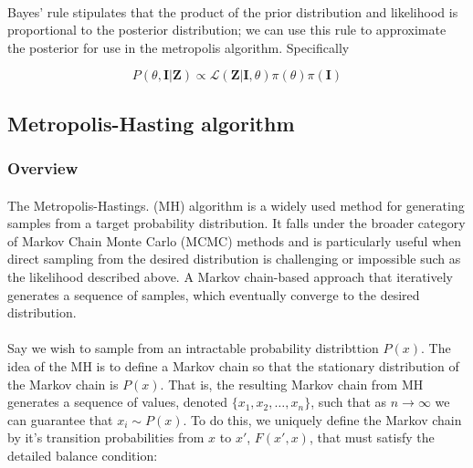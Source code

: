 \paragraph{}Bayes' rule stipulates that the product of the prior distribution and likelihood is proportional to the posterior distribution; we can use this rule to approximate the posterior for use in the metropolis algorithm. Specifically 

\begin{equation}
\label{eq:bayes}
P(\theta, \mathbf{I} | \mathbf{Z}) \propto \mathcal{L}(\mathbf{Z} | \mathbf{I}, \theta)\pi(\theta)\pi(\mathbf{I})
\end{equation}


\subsection{Metropolis-Hasting algorithm}

\subsubsection{Overview}
\paragraph{} The Metropolis-Hastings. (MH) algorithm is a widely used method for generating samples from a target probability distribution. It falls under the broader category of Markov Chain Monte Carlo (MCMC) methods and is particularly useful when direct sampling from the desired distribution is challenging or impossible such as the likelihood described above. A Markov chain-based approach that iteratively generates a sequence of samples, which eventually converge to the desired distribution. 

\paragraph{}Say we wish to sample from an intractable probability distribttion $P(x)$. The idea of the MH is to define a Markov chain so that the stationary distribution of the Markov chain is $P(x)$. That is, the resulting Markov chain from MH generates a sequence of values, denoted $\{x_1, x_2, \dots,  x_n\}$, such that as $n \rightarrow \infty$ we can guarantee that $x_i \sim P(x)$. To do this, we uniquely define the Markov chain by it's transition probabilities from $x$ to $x'$, $F(x', x)$, that must satisfy the detailed balance condition:

